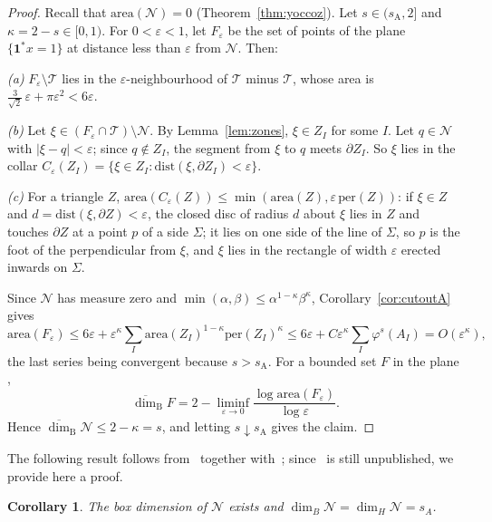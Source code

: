 \documentclass[11pt]{amsart}
\newtheorem{corollary}[proposition]{Corollary}
\theoremstyle{definition}
\theoremstyle{remark}
\newcommand{\one}{\mathbf 1}
\newcommand{\cN}{\mathcal N}
\newcommand{\cT}{\mathcal T}
\newcommand{\udimB}{\overline{\dim}_{\mathrm B}}
\newcommand{\sA}{s_{\mathrm A}}
\newcommand{\abs}[1]{\lvert #1\rvert}
\begin{document}
\begin{proof}
    Recall that $\mathrm{area}(\cN)=0$ (Theorem~\ref{thm:yoccoz}).
    Let $s\in(\sA,2]$ and $\kappa=2-s\in[0,1)$. 
    For $0<\varepsilon<1$, let $F_\varepsilon$ be the set of points of the plane $\{\one^* x=1\}$ at distance less than $\varepsilon$ from $\cN$.
    Then:

    \noindent
    {\em(a)} $F_\varepsilon\setminus\cT$ lies in the $\varepsilon$-neighbourhood of $\cT$   minus $\cT$, whose area is $\frac3{\sqrt2}\,\varepsilon+\pi\varepsilon^2<6\varepsilon$.

    \noindent
    {\em(b)} Let $\xi\in(F_\varepsilon\cap\cT)\setminus\cN$. By Lemma~\ref{lem:zones}, $\xi\in Z_I$ for some $I$. 
    Let $q\in\cN$ with $\abs{\xi-q}<\varepsilon$; since $q\notin Z_I$, the segment from $\xi$ to $q$ meets $\partial Z_I$. 
    So $\xi$ lies in the collar $C_\varepsilon(Z_I)=\{\xi\in Z_I:\mathrm{dist}(\xi,\partial Z_I)<\varepsilon\}$.

    \noindent
    {\em(c)} For a triangle $Z$, $\mathrm{area}(C_\varepsilon(Z))\le\min(\mathrm{area}(Z),\varepsilon\,\mathrm{per}(Z))$:
    if $\xi\in Z$ and $d=\mathrm{dist}(\xi,\partial Z)<\varepsilon$, the closed disc of radius $d$ about $\xi$ lies in $Z$ and touches $\partial Z$ at a point $p$ of a side $\Sigma$; it lies on one side of the line of $\Sigma$, so $p$ is the foot of the perpendicular from $\xi$, and $\xi$ lies in the rectangle of width $\varepsilon$   erected inwards on $\Sigma$.

Since $\cN$ has measure zero and $\min(\alpha,\beta)\le\alpha^{1-\kappa}\beta^\kappa$,
Corollary~\ref{cor:cutoutA} gives
\[
  \mathrm{area}(F_\varepsilon)\le6\varepsilon+\varepsilon^\kappa\sum_I\mathrm{area}(Z_I)^{1-\kappa}\mathrm{per}(Z_I)^\kappa
  \le6\varepsilon+C\varepsilon^\kappa\sum_I\varphi^s(A_I)=O(\varepsilon^\kappa),
\]
the last series being convergent because $s>\sA$. For a bounded set $F$ in the plane
\cite[Prop.~3.2]{FalBook},
\[
  \udimB F=2-\liminf_{\varepsilon\to0}\frac{\log\mathrm{area}(F_\varepsilon)}{\log\varepsilon}.
\]
Hence $\udimB\cN\le2-\kappa=s$, and letting $s\downarrow\sA$ gives the claim.
\end{proof}

The following result follows from~\cite{Sew23} together with~\cite{JLPX23,Jur26}; since~\cite{Sew23} is still unpublished, we provide here a proof.

\begin{corollary}
    \label{cor: dimB}
    The box dimension of $\cN$ exists and $\dim_B\cN=\dim_H\cN=s_A$.
\end{corollary}
\end{document}
